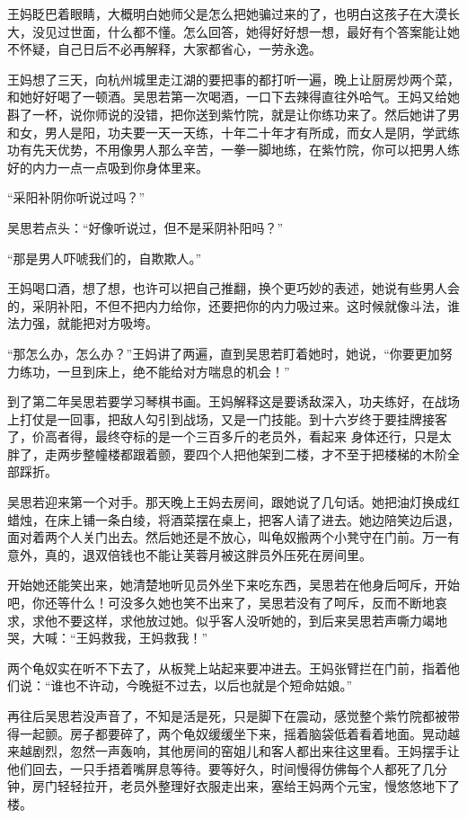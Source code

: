 王妈眨巴着眼睛，大概明白她师父是怎么把她骗过来的了，也明白这孩子在大漠长大，没见过世面，什么都不懂。怎么回答，她得好好想一想，最好有个答案能让她不怀疑，自己日后不必再解释，大家都省心，一劳永逸。

王妈想了三天，向杭州城里走江湖的要把事的都打听一遍，晚上让厨房炒两个菜，和她好好喝了一顿酒。吴思若第一次喝酒，一口下去辣得直往外哈气。王妈又给她斟了一杯，说你师说的没错，把你送到紫竹院，就是让你练功来了。然后她讲了男和女，男人是阳，功夫要一天一天练，十年二十年才有所成，而女人是阴，学武练功有先天优势，不用像男人那么辛苦，一拳一脚地练，在紫竹院，你可以把男人练好的内力一点一点吸到你身体里来。

“采阳补阴你听说过吗？”

吴思若点头：“好像听说过，但不是采阴补阳吗？”

“那是男人吓唬我们的，自欺欺人。”

王妈喝口酒，想了想，也许可以把自己推翻，换个更巧妙的表述，她说有些男人会的，采阴补阳，不但不把内力给你，还要把你的内力吸过来。这时候就像斗法，谁法力强，就能把对方吸垮。

“那怎么办，怎么办？”王妈讲了两遍，直到吴思若盯着她时，她说，“你要更加努力练功，一旦到床上，绝不能给对方喘息的机会！”

到了第二年吴思若要学习琴棋书画。王妈解释这是要诱敌深入，功夫练好，在战场上打仗是一回事，把敌人勾引到战场，又是一门技能。到十六岁终于要挂牌接客了，价高者得，最终夺标的是一个三百多斤的老员外，看起来
身体还行，只是太胖了，走两步整幢楼都跟着颤，要四个人把他架到二楼，才不至于把楼梯的木阶全部踩折。

吴思若迎来第一个对手。那天晚上王妈去房间，跟她说了几句话。她把油灯换成红蜡烛，在床上铺一条白绫，将酒菜摆在桌上，把客人请了进去。她边陪笑边后退，面对着两个人关门出去。然后她还是不放心，叫龟奴搬两个小凳守在门前。万一有意外，真的，退双倍钱也不能让芙蓉月被这胖员外压死在房间里。

开始她还能笑出来，她清楚地听见员外坐下来吃东西，吴思若在他身后呵斥，开始吧，你还等什么！可没多久她也笑不出来了，吴思若没有了呵斥，反而不断地哀求，求他不要这样，求他放过她。似乎客人没听她的，到后来吴思若声嘶力竭地哭，大喊：“王妈救我，王妈救我！”

两个龟奴实在听不下去了，从板凳上站起来要冲进去。王妈张臂拦在门前，指着他们说：“谁也不许动，今晚挺不过去，以后也就是个短命姑娘。”

再往后吴思若没声音了，不知是活是死，只是脚下在震动，感觉整个紫竹院都被带得一起颤。房子都要碎了，两个龟奴缓缓坐下来，摇着脑袋低着看着地面。晃动越来越剧烈，忽然一声轰响，其他房间的窑姐儿和客人都出来往这里看。王妈摆手让他们回去，一只手捂着嘴屏息等待。要等好久，时间慢得仿佛每个人都死了几分钟，房门轻轻拉开，老员外整理好衣服走出来，塞给王妈两个元宝，慢悠悠地下了楼。

